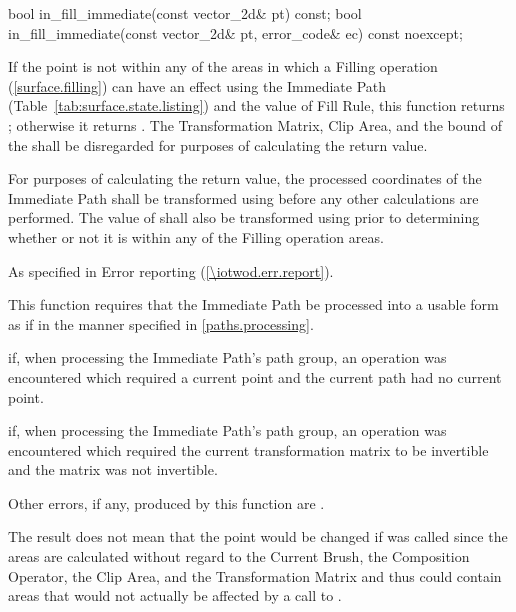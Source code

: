 \begin{itemdecl}
bool in_fill_immediate(const vector_2d& pt) const;
bool in_fill_immediate(const vector_2d& pt, error_code& ec) const noexcept;
\end{itemdecl}
\begin{itemdescr}
\pnum
\returns
If the point  is not within any of the areas in which a Filling operation (\ref{surface.filling}) can have an effect using the Immediate Path (Table~\ref{tab:surface.state.listing}) and the value of Fill Rule, this function returns ; otherwise it returns . The Transformation Matrix, Clip Area, and the bound of the \underlyingsurface shall be disregarded for purposes of calculating the return value.

\pnum
For purposes of calculating the return value, the processed coordinates of the Immediate Path shall be transformed using  before any other calculations are performed. The value of  shall also be transformed using  prior to determining whether or not it is within any of the Filling operation areas.

\pnum
\throws
As specified in Error reporting (\ref{\iotwod.err.report}).

\pnum
\remarks
This function requires that the Immediate Path be processed into a usable form as if in the manner specified in \ref{paths.processing}.

\pnum
\errors
{} if, when processing the Immediate Path's path group, an operation was encountered which required a current point and the current path had no current point.

\pnum
{} if, when processing the Immediate Path's path group, an operation was encountered which required the current transformation matrix to be invertible and the matrix was not invertible.

\pnum
Other errors, if any, produced by this function are .

\pnum
\realnotes
The result does not mean that the point  would be changed if  was called since the areas are calculated without regard to the Current Brush, the Composition Operator, the Clip Area, and the Transformation Matrix and thus could contain areas that would not actually be affected by a call to .
\end{itemdescr}

